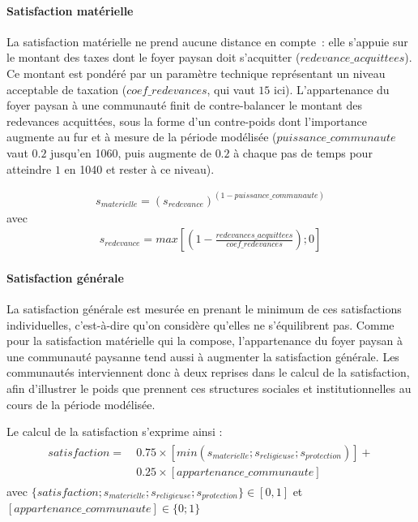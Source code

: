 \paragraph{Satisfaction matérielle}

La satisfaction matérielle ne prend aucune distance en compte : elle s'appuie sur le montant des taxes dont le foyer paysan doit s'acquitter ($redevance\_acquittees$).
Ce montant est pondéré par un paramètre technique représentant un niveau \og acceptable\fg{} de taxation ($coef\_redevances$, qui vaut $15$ ici).
L'appartenance du foyer paysan à une communauté finit de contre-balancer le montant des redevances acquittées, sous la forme d'un contre-poids dont l'importance augmente au fur et à mesure de la période modélisée ($puissance\_communaute$ vaut $0.2$ jusqu'en 1060, puis augmente de $0.2$ à chaque pas de temps pour atteindre $1$ en 1040 et rester à ce niveau).

\begin{equation*}
\begin{gathered}
s_{materielle} = (s_{redevance})^{(1-puissance\_communaute)}
\end{gathered}
\end{equation*}
avec 
\begin{equation*}
\begin{gathered}
s_{redevance} = max \left[ \left( 1- \frac{redevances\_acquittees}{coef\_redevances} \right) ; 0 \right]
\end{gathered}
\end{equation*}

\paragraph{Satisfaction générale}

La satisfaction générale est mesurée en prenant le minimum de ces satisfactions individuelles, c'est-à-dire qu'on considère qu'elles ne s'équilibrent pas.
Comme pour la satisfaction matérielle qui la compose, l'appartenance du foyer paysan à une communauté paysanne tend aussi à augmenter la satisfaction générale.
Les communautés interviennent donc à deux reprises dans le calcul de la satisfaction, afin d'illustrer le poids que prennent ces structures sociales et institutionnelles au cours de la période modélisée.

Le calcul de la satisfaction s'exprime ainsi :
\begin{equation*}
\begin{gathered}
\begin{split}
satisfaction =~& 0.75 \times \left[ min \left( s_{materielle} ; s_ {religieuse}; s_{protection} \right) \right] + \\
& 0.25 \times [appartenance\_communaute]
\end{split}
\end{gathered}
\end{equation*}
avec $ \{satisfaction ; s_{materielle} ; s_ {religieuse} ; s_{protection}\} \in [0,1]$ et $[appartenance\_communaute] \in \{0;1\} $


